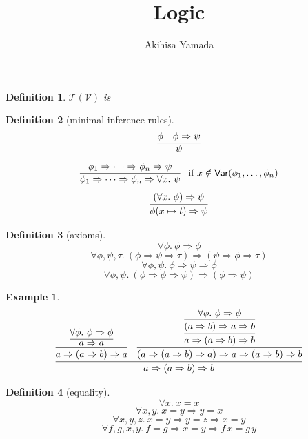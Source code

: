 \documentclass{article}
\author{Akihisa Yamada}
\title{Logic}
\makeatletter
\newtheorem{definition}{Definition}
\newtheorem{example}{Example}
\def\tp@#1#2{\@ifnextchar[{\tp@@{#1}{#2}}{\tp@@@{#1}{#2}}}
\def\tp@@#1#2[#3]#4{#3#1\def\mid{\mathrel{#3|}}#4#3#2}
\def\tp@@@#1#2#3{\bgroup\left#1\def\mid{\;\middle|\;}#3\right#2\egroup}
\def\set{\tp@\{\}}
\newcommand\imp{\Rightarrow}
\newcommand\cV{\mathcal{V}}
\newcommand\Var{\mathsf{Var}}
\newcommand\Term[1]{\mathcal{T}(#1)}
\makeatother
\begin{document}
\maketitle

\begin{definition}
$\Term\cV$ is
\end{definition}

\begin{definition}[minimal inference rules]
\[
	\infer{\psi}{\phi & \phi \imp \psi}
\]
\[
	\infer[\text{ if }x \notin \Var(\phi_1,\dots,\phi_n)]{
		\phi_1 \imp\dots\imp \phi_n \imp \forall x.\ \psi
	}{
		\phi_1 \imp\dots\imp \phi_n \imp \psi
	}
\]
\[
	\infer{\phi(x\mapsto t)\imp\psi}{(\forall x.\ \phi)\imp\psi}
\]
\end{definition}

\begin{definition}[axioms]
\[
\forall \phi.\ \phi \imp \phi
\]
\[
\forall \phi,\psi,\tau.\ (\phi \imp \psi \imp \tau) \imp (\psi \imp \phi \imp \tau)
\]
\[
\forall \phi,\psi.\ \phi \imp \psi \imp \phi
\]
\[
\forall \phi,\psi.\ (\phi \imp \phi \imp \psi) \imp (\phi \imp \psi)
\]
\end{definition}

\begin{example}
\[
	\infer{a \imp (a\imp b) \imp b}{
		\infer{a \imp (a\imp b)\imp a}{
			\infer{a \imp a}{\forall \phi.\ \phi \imp \phi}
		} &
		\infer{(a \imp (a\imp b)\imp a) \imp a \imp (a\imp b) \imp b}{
			\infer{a \imp (a\imp b) \imp b}{
				\infer{(a\imp b)\imp a \imp b}{\forall \phi.\ \phi \imp \phi}
			}
		}
	}
\]
\end{example}

\begin{definition}[equality]
\[
	\forall x.\ x = x
\]
\[
	\forall x,y.\ x = y \imp y = x
\]
\[
	\forall x,y,z.\ x = y \imp y = z \imp x = y
\]
\[
	\forall f,g,x,y.\ f = g \imp x = y \imp f\,x = g\,y
\]
\end{definition}
\end{document}
